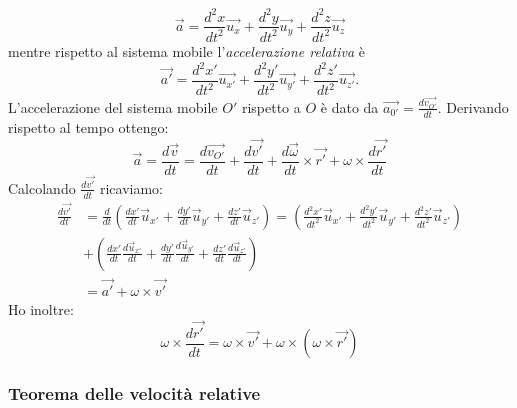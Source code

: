 \documentclass[class=book, crop=false, oneside, 12pt]{standalone}
\begin{document}
\begin{equation}
    \overrightarrow{a} = \frac{d^2 x }{dt^2} \overrightarrow{u_x} + \frac{d^2 y }{dt^2} \overrightarrow{u_y} + \frac{d^2 z }{dt^2} \overrightarrow{u_z}
\end{equation}
mentre rispetto al sistema mobile l'\emph{accelerazione relativa} è
\begin{equation}
    \overrightarrow{a'} = \frac{d^2 x' }{dt^2} \overrightarrow{u_{x'}} + \frac{d^2 y' }{dt^2} \overrightarrow{u_{y'}} + \frac{d^2 z' }{dt^2} \overrightarrow{u_{z'}} . 
\end{equation}
L'accelerazione del sistema mobile \(O'\) rispetto a \(O\) è dato da \(\overrightarrow{a_{0'}} = \frac{d \overrightarrow{v_{O'}}}{dt}\). Derivando rispetto al tempo ottengo:
\begin{equation}
    \overrightarrow{a} = \frac{d \overrightarrow{v}}{dt} = \frac{d \overrightarrow{v_{O'}}}{dt} + \frac{d \overrightarrow{v'}}{dt} + \frac{d \overrightarrow{\omega}}{dt} \times \overrightarrow{r'} + \omega \times \frac{d \overrightarrow{r'}}{dt}
\end{equation}
Calcolando \(\frac{d \overrightarrow{v'}}{dt}\) ricaviamo:
\begin{equation} \label{teorema_acc_rel}
    \begin{aligned}
        \frac{d \overrightarrow{v'}}{d t} &=\frac{d}{d t} \left(\frac{d x'}{d t} \overrightarrow{u}_{x'}+\frac{d y'}{d t} \overrightarrow{u}_{y'}+\frac{d z'}{d t} \overrightarrow{u}_{z'}\right) = \left( \frac{d^{2} x'}{d t^{2}} \overrightarrow{u}_{x'}+\frac{d^{2} y'}{d t^{2}} \overrightarrow{u}_{y'} + \frac{d^{2} z'}{d t^{2}} \overrightarrow{u}_{z'} \right)\\
        & + \left( \frac{d x'}{d t} \frac{d \overrightarrow{u}_{x'}}{d t}+\frac{d y'}{d t} \frac{d \overrightarrow{u}_{y'}}{d t}+\frac{d z'}{d t} \frac{d \overrightarrow{u}_{z'}}{d t} \right) \\
        & =\overrightarrow{a'}+\omega \times \overrightarrow{v'} 
    \end{aligned}
\end{equation}
Ho inoltre:
\begin{equation*}
    \omega \times \frac{d \overrightarrow{r'}}{dt} = \omega \times \overrightarrow{v'} + \omega \times ( \omega \times \overrightarrow{r'})
\end{equation*}

\subsubsection{Teorema delle velocità relative}
\end{document}

